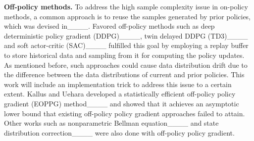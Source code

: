 \textbf{Off-policy methods.} To address the high sample complexity issue in on-policy methods, a common approach is to reuse the samples generated by prior policies, which was devised in____. Favored off-policy methods such as deep deterministic policy gradient (DDPG)____, twin delayed DDPG (TD3)____ and soft actor-critic (SAC)____ fulfilled this goal by employing a replay buffer to store historical data and sampling from it for computing the policy updates. As mentioned before, such approaches could cause data distribution drift due to the difference between the data distributions of current and prior policies. This work will include an implementation trick to address this issue to a certain extent. Kallus and Uehara developed a statistically efficient off-policy policy gradient (EOPPG) method____ and showed that it achieves an asymptotic lower bound that existing off-policy policy gradient approaches failed to attain. Other works such as nonparametric Bellman equation____ and state distribution correction____ were also done with off-policy policy gradient. 

